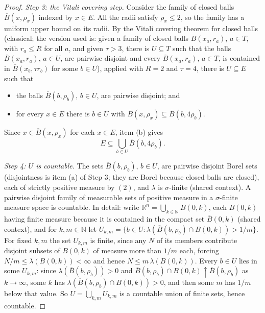 \begin{proof}
\emph{Step 3: the Vitali covering step.}
Consider the family of closed balls $\overline B(x,\rho_x)$ indexed by
$x \in E$.  All the radii satisfy $\rho_x \leq 2$, so the family has a uniform
upper bound on its radii.  By the Vitali covering theorem for closed balls
(classical; the version used is: given a family of closed balls
$\overline B(x_a,r_a)$, $a \in T$, with $r_a \leq R$ for all $a$, and given
$\tau > 3$, there is $U \subseteq T$ such that the balls
$\overline B(x_a,r_a)$, $a \in U$, are pairwise disjoint and every
$\overline B(x_a,r_a)$, $a \in T$, is contained in $\overline
B(x_b,\tau r_b)$ for some $b \in U$), applied with $R = 2$ and $\tau = 4$,
there is $U \subseteq E$ such that
\begin{itemize}
\item[(a)] the balls $\overline B(b,\rho_b)$, $b \in U$, are pairwise
  disjoint; and
\item[(b)] for every $x \in E$ there is $b \in U$ with
  $\overline B(x,\rho_x) \subseteq \overline B(b,4\rho_b)$.
\end{itemize}
Since $x \in \overline B(x,\rho_x)$ for each $x \in E$, item (b) gives
\begin{equation*}
  E \subseteq \bigcup_{b \in U} \overline B(b,4\rho_b) . \tag{5}
\end{equation*}

\emph{Step 4: $U$ is countable.}
The sets $\overline B(b,\rho_b)$, $b \in U$, are pairwise disjoint Borel sets
(disjointness is item (a) of Step 3; they are Borel because closed balls are
closed), each of strictly positive measure by $(2)$, and $\lambda$ is
$\sigma$-finite (shared context).  A pairwise disjoint family of measurable
sets of positive measure in a $\sigma$-finite measure space is countable.  In
detail: write
$\mathbb{R}^n = \bigcup_{k\in\mathbb{N}} B(0,k)$, each $B(0,k)$ having finite
measure because it is contained in the compact set $\overline B(0,k)$ (shared
context), and for $k,m \in \mathbb{N}$ let
$U_{k,m} = \{b \in U : \lambda(\overline B(b,\rho_b)\cap B(0,k)) > 1/m\}$.  For
fixed $k,m$ the set $U_{k,m}$ is finite, since any $N$ of its members contribute
disjoint subsets of $B(0,k)$ of measure more than $1/m$ each, forcing
$N/m \leq \lambda(B(0,k)) < \infty$ and hence
$N \leq m\,\lambda(B(0,k))$.  Every $b \in U$ lies in some $U_{k,m}$: since
$\lambda(\overline B(b,\rho_b)) > 0$ and
$\overline B(b,\rho_b)\cap B(0,k) \uparrow \overline B(b,\rho_b)$ as
$k \to \infty$, some $k$ has
$\lambda(\overline B(b,\rho_b)\cap B(0,k)) > 0$, and then some $m$ has
$1/m$ below that value.  So $U = \bigcup_{k,m}U_{k,m}$ is a countable union of
finite sets, hence countable.


\end{proof}
